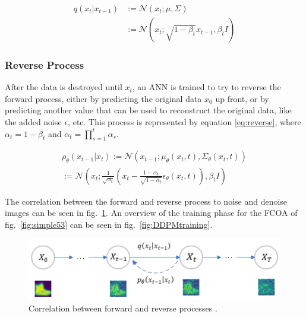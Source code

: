 \documentclass[conference]{IEEEtran}
\begin{document}
	\begin{equation} \label{eq:forward}
	\begin{aligned}
	q(x_{t}|x_{t-1}) &:= \mathcal{N}(x_{t};\mu,\Sigma) \\ &:= \mathcal{N}(x_{t};\sqrt{1-\beta_{t}}x_{t-1}, \beta_{t}I)
	\end{aligned}
	\end{equation}
	
	\subsubsection{Reverse Process}
	After the data is destroyed until $x_{t}$, an ANN is trained to try to reverse the forward process, either by predicting the original data $x_{0}$ up front, or by predicting another value that can be used to reconstruct the original data, like the added noise $\epsilon$, etc. This process is represented by equation \ref{eq:reverse}, where $\alpha_{t}=1-\beta_{t}$ and $\overline{\alpha}_{t}=\prod_{s=1}^{t}\alpha_{s}$.
	
	\begin{equation} \label{eq:reverse}
	\begin{split}
		\rho_{\theta}(x_{t-1}|x_{t}) := \mathcal{N}(x_{t-1};\mu_{\theta}(x_{t},t),\Sigma_{\theta}(x_{t},t)) \\:= \mathcal{N}(x_{t};\frac{1}{\sqrt{\alpha_{t}}}(x_{t}-\frac{1-\alpha_{t}}{\sqrt{1-\overline{\alpha}_{t}}}\epsilon_{\theta}(x_{t},t)),\beta_{t}I) 
	\end{split}
	\end{equation}
	
	The correlation between the forward and reverse process to noise and denoise images can be seen in fig.~\ref{fig:forward_reverse}. An overview of the training phase for the FCOA of fig.~\ref{fig:simple53} can be seen in fig.~\ref{fig:DDPMtraining}.
	
	\begin{figure}[h]
		\centering
		\includegraphics[width=\linewidth]{figures/ForwardReverseDDPM}
		\setlength{\abovecaptionskip}{0ex}%
		\setlength{\belowcaptionskip}{-2ex}%
		\caption{Correlation between forward and reverse processes \cite{eid24diffusion}.}
		\label{fig:forward_reverse}
	\end{figure}
	
\end{document}
